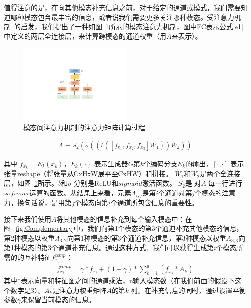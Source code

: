 值得注意的是，在向其他模态补充信息之前，对于给定的通道或模式，我们需要知道哪种模态包含最丰富的信息，或者说我们需要更多关注哪种模态。受注意力机制~\cite{seq2seq,attentionallyouneed,nonlocal,sagan}的启发，我们提出了一种如图~\ref{f2}所示的模态注意力机制，图中FC表示公式\ref{e1}中定义的两层全连接层，来计算跨模态的通道权重（用$A$来表示）。

\begin{figure}
	\centering
	\includegraphics[width=0.5\textwidth]{figures/JAGAN/20201109InterAttention_function_AV1_0.pdf}
	\caption[]{模态间注意力机制的注意力矩阵计算过程}
	\label{f2}
\end{figure}

\begin{align}
	A = S_2(\sigma((\delta([f_{x_1}, f_{x_2}, f_{x_3}]W_1))W_2))\
	\label{e1}
\end{align}

其中 $f_{x_k}=E_k(x_k)$，$E_k(\cdot)$ 表示生成器$G$第$k$个编码分支$E_k$的输出，$[\cdot,\cdot]$ 表示张量reshape（将张量从CxHxW展平至CxHW）和拼接。 $W_1$和$W_2$是两个全连接层，如图~\ref{f2}所示。$\delta$和$\sigma$ 分别是ReLU\cite{nair2010rectified}和$sigmoid$激活函数。 $S_2$是 对$A$ 每一行进行$softmax$运算的函数。从结果上来看，元素$A_{i,j}$是第$i$个通道对第$j$个模态的注意力，换句话说，是用第$j$个模态向第$i$个通道所包含信息的重要性。

接下来我们使用$A$将其他模态的信息补充到每个输入模态中：在图~\ref{fig:Complementary}中，我们向第1个模态的第3个通道补充其他模态的信息，第2种模态以权重$A_{3,2}$向第1种模态的第3个通道补充信息，第3种模态以权重$A_{3,3}$向第1种模态的第3个通道补充信息。通过这种方式，我们可以获得生成第$i$个模态所需的的互补特征$f_{x_i}^{comp}$：
\begin{gather}
	f_{x_i}^{comp} = \gamma * f_{x_i} +
	(1-\gamma) * \sum_{k=1}^n (f_{x_k} * A_{k})\
\end{gather}
其中$*$表示向量和特征图之间的通道乘法，n输入模态数（在我们前面的假设下这个数字是3）。$A_{k}$是注意力权重矩阵$A$的第$k$ 列。在补充信息的同时，通过设置平衡参数$\gamma$来保留当前模态的信息。

